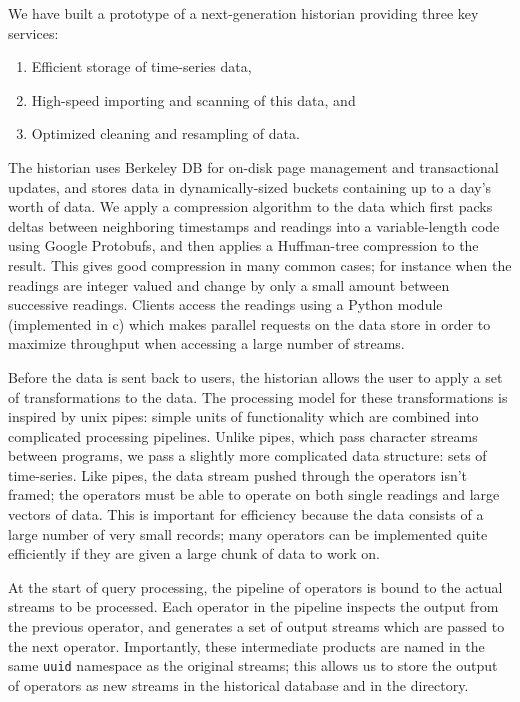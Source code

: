We have built a prototype of a next-generation historian providing three key services:
\begin{enumerate}
\item Efficient storage of time-series data,
\item High-speed importing and scanning of this data, and
\item Optimized cleaning and resampling of data.
\end{enumerate}

The historian uses Berkeley DB for on-disk page management and transactional updates, and stores data in dynamically-sized buckets containing up to a day's worth of data.  We apply a compression algorithm to the data which first packs deltas between neighboring timestamps and readings into a variable-length code using Google Protobufs, and then applies a Huffman-tree compression to the result.  This gives good compression in many common cases; for instance when the readings are integer valued and change by only a small amount between successive readings.  Clients access the readings using a Python module (implemented in c) which makes parallel requests on the data store in order to maximize throughput when accessing a large number of streams.

Before the data is sent back to users, the historian allows the user to apply a set of transformations to the data.  The processing model for these transformations is inspired by unix pipes: simple units of functionality which are combined into complicated processing pipelines.  Unlike pipes, which pass character streams between programs, we pass a slightly more complicated data structure: sets of time-series.  Like pipes, the data stream pushed through the operators isn't framed; the operators must be able to operate on both single readings and large vectors of data.  This is important for efficiency because the data consists of a large number of very small records; many operators can be implemented quite efficiently if they are given a large chunk of data to work on.  

At the start of query processing, the pipeline of operators is bound to the actual streams to be processed.  Each operator in the pipeline inspects the output from the previous operator, and generates a set of output streams which are passed to the next operator.  Importantly, these intermediate products are named in the same {\tt uuid} namespace as the original streams; this allows us to store the output of operators as new streams in the historical database and in the directory.  

